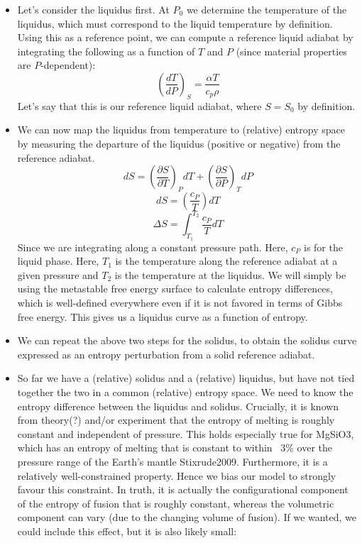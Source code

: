 \begin{itemize}
\item Let's consider the liquidus first.  At $P_0$ we determine the temperature of the liquidus, which must correspond to the liquid temperature by definition.  Using this as a reference point, we can compute a reference liquid adiabat by integrating the following as a function of $T$ and $P$ (since material properties are $P$-dependent):
\begin{equation}
\left( \frac{dT}{dP} \right)_S = \frac{\alpha T}{c_p \rho}
\label{eqn:adiabat}
\end{equation}
Let's say that this is our reference liquid adiabat, where $S=S_0$ by definition.
\item We can now map the liquidus from temperature to (relative) entropy space by measuring the departure of the liquidus (positive or negative) from the reference adiabat.
\begin{equation}
dS = \left( \frac{\partial S}{\partial T} \right)_P dT + \left( \frac{\partial S}{\partial P} \right)_T dP
\end{equation}
\begin{equation}
dS = \left( \frac{c_P}{T} \right) dT
\label{eqn:dS}
\end{equation}
\begin{equation}
\Delta S = \int_{T_1}^{T_{2}} \frac{c_P}{T} dT
\label{eqn:int_dS}
\end{equation}
Since we are integrating along a constant pressure path.  Here, $c_P$ is for the liquid phase.  Here, $T_1$ is the temperature along the reference adiabat at a given pressure and $T_2$ is the temperature at the liquidus.  We will simply be using the metastable free energy surface to calculate entropy differences, which is well-defined everywhere even if it is not favored in terms of Gibbs free energy.  This gives us a liquidus curve as a function of entropy.
\item We can repeat the above two steps for the solidus, to obtain the solidus curve expressed as an entropy perturbation from a solid reference adiabat.
\item So far we have a (relative) solidus and a (relative) liquidus, but have not tied together the two in a common (relative) entropy space.  We need to know the entropy difference between the liquidus and solidus.  Crucially, it is known from theory(?) and/or experiment that the entropy of melting is roughly constant and independent of pressure.  This holds especially true for MgSiO3, which has an entropy of melting that is constant to within ~3\% over the pressure range of the Earth's mantle Stixrude2009.  Furthermore, it is a relatively well-constrained property.  Hence we bias our model to strongly favour this constraint.  In truth, it is actually the configurational component of the entropy of fusion that is roughly constant, whereas the volumetric component can vary (due to the changing volume of fusion). If we wanted, we could include this effect, but it is also likely small:

\end{itemize}
